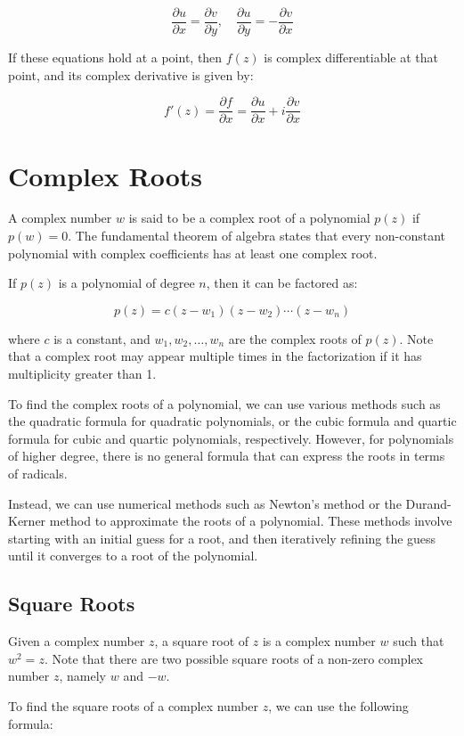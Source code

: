 \documentclass{article}
\begin{document}
\[
\frac{\partial u}{\partial x} = \frac{\partial v}{\partial y}, \quad \frac{\partial u}{\partial y} = -\frac{\partial v}{\partial x}
\]

If these equations hold at a point, then $f(z)$ is complex differentiable at
that point, and its complex derivative is given by:

\[
f'(z) = \frac{\partial f}{\partial x} = \frac{\partial u}{\partial x} + i\frac{\partial v}{\partial x}
\]


\section{Complex Roots}
A complex number $w$ is said to be a complex root of a polynomial $p(z)$ if
$p(w) = 0$. The fundamental theorem of algebra states that every non-constant
polynomial with complex coefficients has at least one complex root.

If $p(z)$ is a polynomial of degree $n$, then it can be factored as:

$$p(z) = c(z - w_1)(z - w_2)\cdots(z - w_n)$$

where $c$ is a constant, and $w_1, w_2, \ldots, w_n$ are the complex roots of
$p(z)$. Note that a complex root may appear multiple times in the factorization
if it has multiplicity greater than 1.

To find the complex roots of a polynomial, we can use various methods such as
the quadratic formula for quadratic polynomials, or the cubic formula and
quartic formula for cubic and quartic polynomials, respectively. However, for
polynomials of higher degree, there is no general formula that can express the
roots in terms of radicals.

Instead, we can use numerical methods such as Newton's method or the
Durand-Kerner method to approximate the roots of a polynomial. These methods
involve starting with an initial guess for a root, and then iteratively
refining the guess until it converges to a root of the polynomial.

\subsection{Square Roots}
Given a complex number $z$, a square root of $z$ is a complex number $w$ such
that $w^2 = z$. Note that there are two possible square roots of a non-zero
complex number $z$, namely $w$ and $-w$.

To find the square roots of a complex number $z$, we can use the following
formula:
\end{document}
